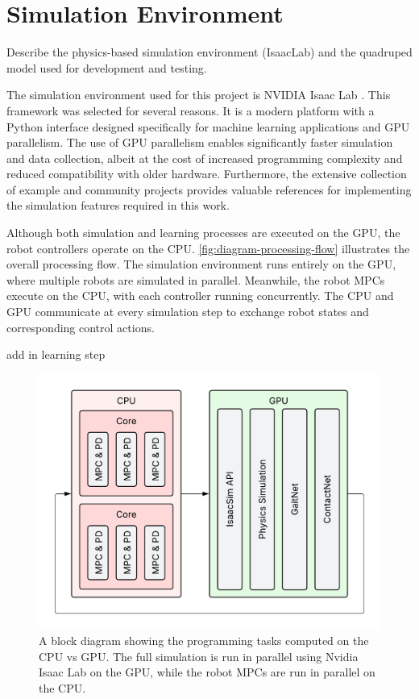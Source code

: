 \section{Simulation Environment}
\label{sec:simulation-environment}

\begin{outline}
  Describe the physics-based simulation environment (IsaacLab) and
  the quadruped model used for development and testing.
\end{outline}

The simulation environment used for this project is NVIDIA Isaac Lab
\cite{mittal_orbit_2023}. This framework was selected for several
reasons. It is a modern platform with a Python interface designed
specifically for machine learning applications and GPU parallelism.
The use of GPU parallelism enables significantly faster simulation
and data collection, albeit at the cost of increased programming
complexity and reduced compatibility with older hardware.
Furthermore, the extensive collection of example and community
projects provides valuable references for implementing the simulation
features required in this work.

Although both simulation and learning processes are executed on the
GPU, the robot controllers operate on the CPU.
\autoref{fig:diagram-processing-flow} illustrates the overall
processing flow. The simulation environment runs entirely on the GPU,
where multiple robots are simulated in parallel. Meanwhile, the robot
MPCs execute on the CPU, with each controller running concurrently.
The CPU and GPU communicate at every simulation step to exchange
robot states and corresponding control actions.

\begin{todo}
  add in learning step
\end{todo}

\begin{figure}[H]
  \centering
  \includegraphics[width=0.5\linewidth]{images/diagrams/processing-flow.png}
  \caption{A block diagram showing the programming tasks computed on
    the CPU vs GPU. The full simulation is run in parallel using Nvidia
  Isaac Lab on the GPU, while the robot MPCs are run in parallel on the CPU.}
  \label{fig:diagram-processing-flow}
\end{figure}

